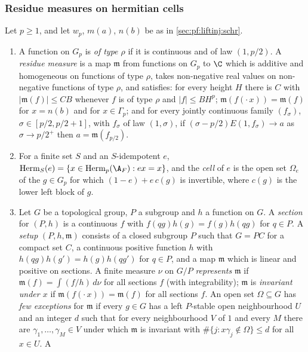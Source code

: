 \subsubsection{Residue measures on hermitian cells}\label{sec:pf:liftinj:cellsec}

\begin{definition}\label{pf:liftinj:resmudef}
Let $p\ge1$, and let $w_p$, $m(a)$, $n(b)$ be as in \cref{sec:pf:liftinj:schr}.
\begin{enumerate}[label=(\alph*)]
\item A function on $G_p$ is \emph{of type $\rho$} if it is continuous and of law $(1,p/2)$. A \emph{residue measure} is a map $\mathfrak m$ from
functions on $G_p$ to $\C$ which is additive and homogeneous on functions of type $\rho$, takes non-negative real values on non-negative
functions of type $\rho$, and satisfies: for every height $H$ there is $C$ with $|\mathfrak m(f)|\le CB$ whenever $f$ is of type $\rho$ and
$|f|\le BH^p$; $\mathfrak m(f(\cdot\,x))=\mathfrak m(f)$ for $x=n(b)$ and for $x\in\Gamma_p$; and for every jointly continuous family $(f_\sigma)$,
$\sigma\in[p/2,p/2+1]$, with $f_\sigma$ of law $(1,\sigma)$, if $(\sigma-p/2)E(1,f_\sigma)\to a$ as $\sigma\to p/2^+$ then $a=\mathfrak m(f_{p/2})$.
\item For a finite set $S$ and an $S$-idempotent $e$, $\mathrm{Herm}_S(e)=\{x\in\mathrm{Herm}_p(\A_F):ex=x\}$, and the \emph{cell} of $e$ is the
open set $\Omega_e$ of the $g\in G_p$ for which $(1-e)+e\,c(g)$ is invertible, where $c(g)$ is the lower left block of $g$.
\item Let $G$ be a topological group, $P$ a subgroup and $h$ a function on $G$. A \emph{section} for $(P,h)$ is a continuous $f$ with
$f(qg)h(g)=f(g)h(qg)$ for $q\in P$. A \emph{setup} $(P,h,\mathfrak m)$ consists of a closed subgroup $P$ such that $G=PC$ for a compact set $C$, a
continuous positive function $h$ with $h(qg)h(g')=h(g)h(qg')$ for $q\in P$, and a map $\mathfrak m$ which is linear and positive on sections. A
finite measure $\nu$ on $G/P$ \emph{represents} $\mathfrak m$ if $\mathfrak m(f)=\int(f/h)\,d\nu$ for all sections $f$ (with integrability); $\mathfrak m$ is
\emph{invariant under $x$} if $\mathfrak m(f(\cdot\,x))=\mathfrak m(f)$ for all sections $f$. An open set $\Omega\subseteq G$ has \emph{few exceptions} for
$\mathfrak m$ if every $g\in G$ has a left $P$-stable open neighbourhood $U$ and an integer $d$ such that for every neighbourhood $V$ of $1$ and every
$M$ there are $\gamma_1,\dots,\gamma_M\in V$ under which $\mathfrak m$ is invariant with $\#\{j:x\gamma_j\notin\Omega\}\le d$ for all $x\in U$. A

\end{enumerate}
\end{definition}
